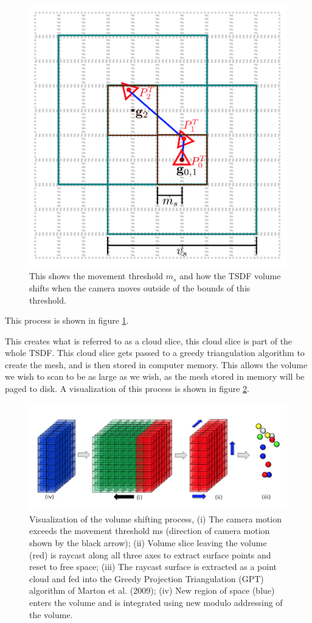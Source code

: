 \documentclass[10pt, twocolumn]{article}
\begin{document}
\begin{figure}
  \centering
  \includegraphics[width=0.8\linewidth]{tsdfshift}
  \caption{This shows the movement threshold $m_s$ and how the TSDF volume shifts when the camera moves outside of the bounds of this threshold.}
  \label{fig:tsdfshift}
\end{figure}

This process is shown in figure \ref{fig:tsdfshift}.


This creates what is referred to as a cloud slice, this cloud slice is part of the whole TSDF. This cloud slice gets passed to a greedy triangulation algorithm to create the mesh, and is then stored in computer memory. This allows the volume we wish to scan to be as large as we wish, as the mesh stored in memory will be paged to disk. A visualization of this process is shown in figure \ref{fig:cloudslice}.

\begin{figure}
  \centering
  \includegraphics[width=1.0\linewidth]{cloudslice}
  \caption{Visualization of the volume shifting process, (i) The camera motion exceeds the movement threshold ms (direction of camera motion shown by the black arrow); (ii) Volume slice leaving the volume (red) is raycast along all three axes to extract surface points and reset to free space; (iii) The raycast surface is extracted as a point cloud and fed into the Greedy Projection Triangulation (GPT) algorithm of Marton et al. (2009); (iv) New region of space (blue) enters the volume and is integrated using new modulo addressing of the volume.}
  \label{fig:cloudslice}
\end{figure}
\end{document}
